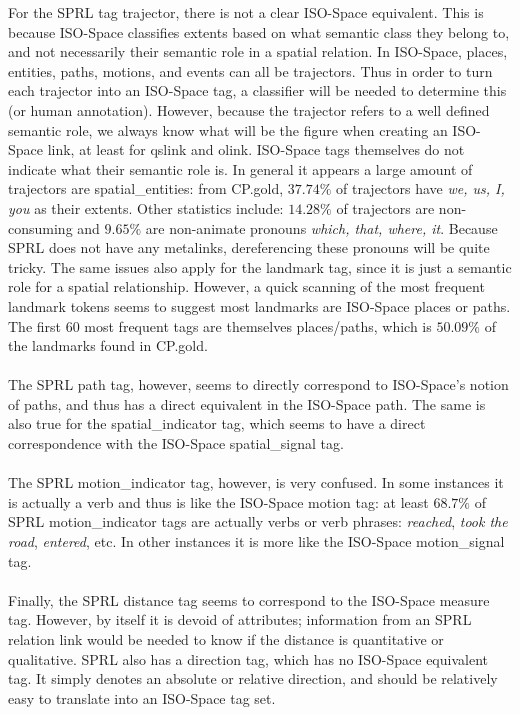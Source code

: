 \documentclass{article}
\begin{document}
For the SPRL tag {\sc trajector}, there is not a clear ISO-Space equivalent.  This is because ISO-Space classifies extents based on what semantic class they belong to, and not necessarily their semantic role in a spatial relation.   In ISO-Space, places, entities, paths, motions, and events can all be trajectors.  Thus in order to turn each {\sc trajector} into an ISO-Space tag, a classifier will be needed to determine this (or human annotation).  However, because the {\sc trajector} refers to a well defined semantic role, we always know what will be the figure when creating an ISO-Space link, at least for {\sc qslink} and {\sc olink}.  ISO-Space tags themselves do not indicate what their semantic role is.  In general it appears a large amount of {\sc trajector}s are {\sc spatial\_entities}: from CP.gold, $37.74\%$ of {\sc trajector}s have \emph{we, us, I, you} as their extents.  Other statistics include: $14.28\%$ of {\sc trajector}s are non-consuming and $9.65\%$ are non-animate pronouns \emph{which, that, where, it}.  Because SPRL does not have any {\sc metalink}s, dereferencing these pronouns will be quite tricky.  The same issues also apply for the {\sc landmark} tag, since it is just a semantic role for a spatial relationship.  However, a quick scanning of the most frequent {\sc landmark} tokens seems to suggest most {\sc landmark}s are ISO-Space {\sc place}s or {\sc path}s.  The first 60 most frequent tags are themselves places/paths, which is $50.09\%$ of the {\sc landmark}s found in CP.gold.  
\\
\\
The SPRL {\sc path} tag, however, seems to directly correspond to ISO-Space's notion of paths, and thus has a direct equivalent in the ISO-Space {\sc path}.  The same is also true for the {\sc spatial\_indicator} tag, which seems to have a direct correspondence with the ISO-Space {\sc spatial\_signal} tag.  
\\
\\
The SPRL {\sc motion\_indicator} tag, however, is very confused.  In some instances it is actually a verb and thus is like the ISO-Space {\sc motion} tag: at least $68.7\%$ of SPRL {\sc motion\_indicator} tags are actually verbs or verb phrases: \emph{reached}, \emph{took the road}, \emph{entered}, etc.  In other instances it is more like the ISO-Space {\sc motion\_signal} tag. 
\\
\\
Finally, the SPRL {\sc distance} tag seems to correspond to the ISO-Space {\sc measure} tag.  However, by itself it is devoid of attributes; information from an SPRL {\sc relation} link would be needed to know if the {\sc distance} is quantitative or qualitative.  SPRL also has a {\sc direction} tag, which has no ISO-Space equivalent tag.  It simply denotes an absolute or relative direction, and should be relatively easy to translate into an ISO-Space tag set.
\end{document}
